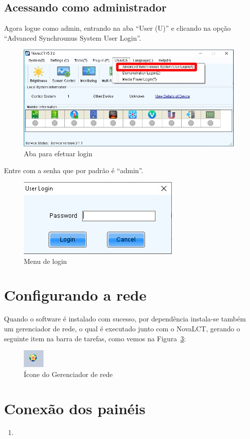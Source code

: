 \documentclass[12pt, a4paper]{article}
\begin{document}
\subsection{Acessando como administrador}\label{Acessando como administrador}
Agora logue como admin, entrando na aba ``User (U)'' e clicando na opção ``Advanced Synchrounus System User Login''.
\begin{figure}[!htb]
	\centering
	\includegraphics[width=\textwidth]{CS2.jpeg}
	\caption{\label{fig:CS2.jpeg}Aba para efetuar login}
\end{figure}

\newpage
Entre com a senha que por padrão é ``admin''.
\begin{figure}[!htb]
	\centering
	\includegraphics[width=.6\textwidth]{CS3.jpeg}
	\caption{\label{fig:CS3.jpeg}Menu de login}
\end{figure}

\section{Configurando a rede}\label{Configurando a rede}

Quando o software é instalado com sucesso, por dependência instala-se também um gerenciador de rede, o qual é executado junto com o NovaLCT, gerando o seguinte item na barra de tarefas, como vemos na Figura~\ref{fig:barra_de_tarefas.jpeg}:
\begin{figure}[!htb]
	\centering
	\includegraphics{barra_de_tarefas.jpeg}
	\caption{\label{fig:barra_de_tarefas.jpeg}Ícone do Gerenciador de rede}
\end{figure}

\section{Conexão dos painéis}\label{Conexão dos painéis}
\begin{enumerate}
	\item 
\end{enumerate}

\cleardoublepage

\end{document}
